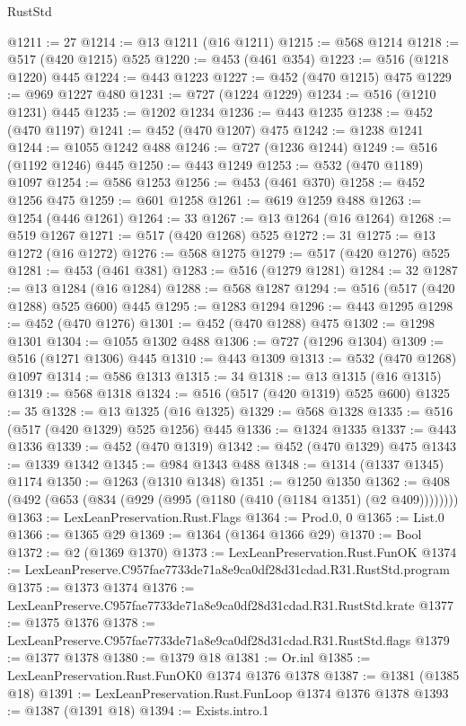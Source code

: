 \begin{lexlean}{RustStd}
\begin{coremodule}
@1211 := 27
@1214 := @13 @1211 (@16 @1211)
@1215 := @568 @1214
@1218 := @517 (@420 @1215) @525
@1220 := @453 (@461 @354)
@1223 := @516 (@1218 @1220) @445
@1224 := @443 @1223
@1227 := @452 (@470 @1215) @475
@1229 := @969 @1227 @480
@1231 := @727 (@1224 @1229)
@1234 := @516 (@1210 @1231) @445
@1235 := @1202 @1234
@1236 := @443 @1235
@1238 := @452 (@470 @1197)
@1241 := @452 (@470 @1207) @475
@1242 := @1238 @1241
@1244 := @1055 @1242 @488
@1246 := @727 (@1236 @1244)
@1249 := @516 (@1192 @1246) @445
@1250 := @443 @1249
@1253 := @532 (@470 @1189) @1097
@1254 := @586 @1253
@1256 := @453 (@461 @370)
@1258 := @452 @1256 @475
@1259 := @601 @1258
@1261 := @619 @1259 @488
@1263 := @1254 (@446 @1261)
@1264 := 33
@1267 := @13 @1264 (@16 @1264)
@1268 := @519 @1267
@1271 := @517 (@420 @1268) @525
@1272 := 31
@1275 := @13 @1272 (@16 @1272)
@1276 := @568 @1275
@1279 := @517 (@420 @1276) @525
@1281 := @453 (@461 @381)
@1283 := @516 (@1279 @1281)
@1284 := 32
@1287 := @13 @1284 (@16 @1284)
@1288 := @568 @1287
@1294 := @516 (@517 (@420 @1288) @525 @600) @445
@1295 := @1283 @1294
@1296 := @443 @1295
@1298 := @452 (@470 @1276)
@1301 := @452 (@470 @1288) @475
@1302 := @1298 @1301
@1304 := @1055 @1302 @488
@1306 := @727 (@1296 @1304)
@1309 := @516 (@1271 @1306) @445
@1310 := @443 @1309
@1313 := @532 (@470 @1268) @1097
@1314 := @586 @1313
@1315 := 34
@1318 := @13 @1315 (@16 @1315)
@1319 := @568 @1318
@1324 := @516 (@517 (@420 @1319) @525 @600)
@1325 := 35
@1328 := @13 @1325 (@16 @1325)
@1329 := @568 @1328
@1335 := @516 (@517 (@420 @1329) @525 @1256) @445
@1336 := @1324 @1335
@1337 := @443 @1336
@1339 := @452 (@470 @1319)
@1342 := @452 (@470 @1329) @475
@1343 := @1339 @1342
@1345 := @984 @1343 @488
@1348 := @1314 (@1337 @1345) @1174
@1350 := @1263 (@1310 @1348)
@1351 := @1250 @1350
@1362 := @408 (@492 (@653 (@834 (@929 (@995 (@1180 (@410 (@1184 @1351) (@2 @409))))))))
@1363 := LexLeanPreservation.Rust.Flags
@1364 := Prod.{0, 0}
@1365 := List.{0}
@1366 := @1365 @29
@1369 := @1364 (@1364 @1366 @29)
@1370 := Bool
@1372 := @2 (@1369 @1370)
@1373 := LexLeanPreservation.Rust.FunOK
@1374 := LexLeanPreserve.C957fae7733de71a8e9ca0df28d31cdad.R31.RustStd.program
@1375 := @1373 @1374
@1376 := LexLeanPreserve.C957fae7733de71a8e9ca0df28d31cdad.R31.RustStd.krate
@1377 := @1375 @1376
@1378 := LexLeanPreserve.C957fae7733de71a8e9ca0df28d31cdad.R31.RustStd.flags
@1379 := @1377 @1378
@1380 := @1379 @18
@1381 := Or.inl
@1385 := LexLeanPreservation.Rust.FunOK0 @1374 @1376 @1378
@1387 := @1381 (@1385 @18)
@1391 := LexLeanPreservation.Rust.FunLoop @1374 @1376 @1378
@1393 := @1387 (@1391 @18)
@1394 := Exists.intro.{1}

\end{coremodule}
\end{lexlean}
